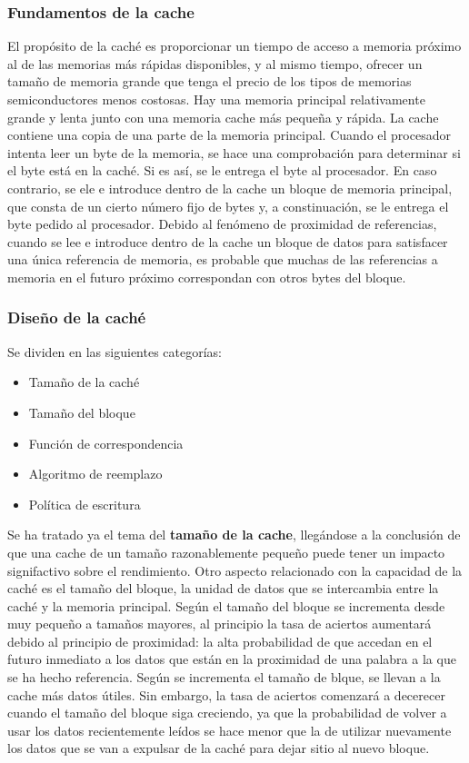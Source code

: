 \documentclass{article}
\begin{document}
		\subsubsection{Fundamentos de la cache}
			El propósito de la caché es proporcionar un tiempo de acceso a memoria próximo al de las memorias más rápidas disponibles, y al mismo tiempo, ofrecer un tamaño de memoria grande que tenga el precio de los tipos de memorias semiconductores menos costosas. Hay una memoria principal relativamente grande y lenta junto con una memoria cache más pequeña y rápida. La cache contiene una copia de una parte de la memoria principal. Cuando el procesador intenta leer un byte de la memoria, se hace una comprobación para determinar si el byte está en la caché. Si es así, se le entrega el byte al procesador. En caso contrario, se ele e introduce dentro de la cache un bloque de memoria principal, que consta de un cierto número fijo de bytes y, a constinuación, se le entrega el byte pedido al procesador. Debido al fenómeno de proximidad de referencias, cuando se lee e introduce dentro de la cache un bloque de datos para satisfacer una única referencia de memoria, es probable que muchas de las referencias a memoria en el futuro próximo correspondan con otros bytes del bloque. \\
			
		\subsubsection{Diseño de la caché}
			Se dividen en las siguientes categorías:
			\begin{itemize}
			\item Tamaño de la caché
			\item Tamaño del bloque
			\item Función de correspondencia
			\item Algoritmo de reemplazo
			\item Política de escritura
			\end{itemize}
			
			Se ha tratado ya el tema del \textbf{tamaño de la cache}, llegándose a la conclusión de que una cache de un tamaño razonablemente pequeño puede tener un impacto signifactivo sobre el rendimiento. Otro aspecto relacionado con la capacidad de la caché es el tamaño del bloque, la unidad de datos que se intercambia entre la caché y la memoria principal. Según el tamaño del bloque se incrementa desde muy pequeño a tamaños mayores, al principio la tasa de aciertos aumentará debido al principio de proximidad: la alta probabilidad de que accedan en el futuro inmediato a los datos que están en la proximidad de una palabra a la que se ha hecho referencia. Según se incrementa el tamaño de blque, se llevan a la cache más datos útiles. Sin embargo, la tasa de aciertos comenzará a decerecer cuando el tamaño del bloque siga creciendo, ya que la probabilidad de volver a usar los datos recientemente leídos se hace menor que la de utilizar nuevamente los datos que se van a expulsar de la caché para dejar sitio al nuevo bloque. \\
			
\end{document}

